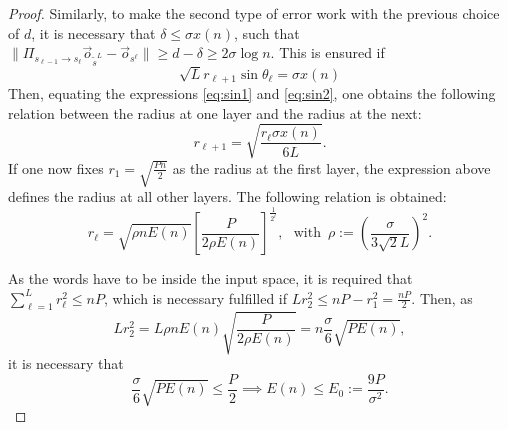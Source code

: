 \documentclass[10pt,a4paper]{amsart}
\begin{document}
\begin{proof}
Similarly, to make the second type of error work with the previous choice of $d$, it is necessary that $\delta\leq \sigma x(n)$, such that $\|\Pi_{s_{\ell-1}\to s_{\ell}}\vec{o}_{\tilde{s}^{L}}-\vec{o}_{s^\ell}\|\geq d-\delta\geq 2\sigma\log n$. This is ensured if 
\begin{equation}\label{eq:sin2}
\sqrt{L}r_{\ell+1}\sin\theta_\ell=\sigma x(n)
\end{equation}
Then, equating the expressions \eqref{eq:sin1} and \eqref{eq:sin2}, one obtains the following relation between the radius at one layer and the radius at the next:
\begin{equation}\label{eq:RR_hierarchy}
    r_{\ell+1}=\sqrt{\frac{r_\ell\sigma x(n)}{6L}}.
\end{equation}
If one now fixes $r_1=\sqrt{\frac{Pn}{2}}$ as the radius at the first layer, the expression above defines the radius at all other layers. The following relation is obtained:
\begin{equation}\label{eq:RR_radius}
r_\ell = \sqrt{\rho n E(n)}\left[\frac{P}{2\rho E(n)}\right]^\frac{1}{2^\ell}\!\!,\,\,\,\,\text{with}\,\,\,\rho:=\left(\frac{\sigma}{3\sqrt{2}L}\right)^2\!\!.
\end{equation}

As the words have to be inside the input space, it is required that $\sum_{\ell=1}^L r_\ell^2\leq nP$, which is necessary fulfilled if $L r_2^2\leq nP-r_1^2=\frac{nP}{2}$. Then, as
\begin{equation}
L r_2^2=L\rho n E(n)\sqrt{\frac{P}{2\rho E(n)}}=n\frac{\sigma}{6}\sqrt{PE(n)},
\end{equation}
it is necessary that
\begin{equation}
\frac{\sigma}{6}\sqrt{PE(n)}\leq\frac{P}{2}\implies E(n)\leq E_0:=\frac{9P}{\sigma^2}.
\end{equation}


\end{proof}
\end{document}
